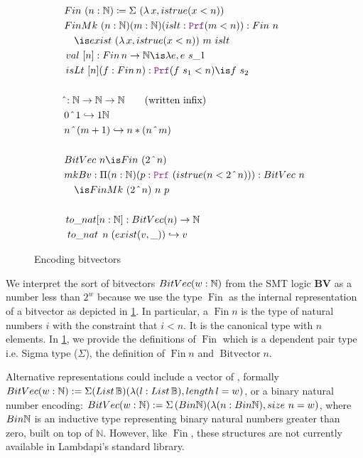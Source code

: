 \begin{figure}
\begin{framed}
\begin{align*}
& Fin~(n: \N) \coloneq \Sigma~(\lambda\,x, istrue(x < n)) \\
& FinMk~(n: \N) (m: \N) (islt: \prf (m < n)) : Fin~n \\
&\quad\is exist~(\lambda\,x, istrue(x <n))~m~islt\\
&\mathop{val}~[n]: \mathop{Fin} n \ra \N \is \lambda e, e~s\_1 \\
&\mathop{isLt}~[n] (f: \mathop{Fin} n): \prf (f~s_1 < n) \is f~s_2\\
&\\
& \hat{}: \N \ra \N \ra \N \qquad \text{(written inﬁx)}\\
& 0 ~\hat{}~ 1 \re 1 \N\\
& n ~\hat{}~ (m + 1) \re n * (n ~\hat{}~ m)\\
&\\
&BitVec~n \is Fin~(2~\hat{}~n) \\ 
& mkBv: \Pi(n: \N)(p: \prf~(istrue(n < 2~\hat{}~n))): BitVec~n\\
&\quad\is FinMk~(2~\hat{}~n)~n~p\\
&\\
&\mathop{to\_nat}[n : \mathbb{N}] : \mathop{BitVec}(n) \ra \mathbb{N} \\
&\,\mathop{to\_nat}\;n\;(\mathop{exist}(v,\_))\re v
\end{align*}
\end{framed}
\caption{Encoding bitvectors}
\label{fig:bitvector-def}
\end{figure}

We interpret the sort of bitvectors $\mathop{BitVec}(w: \mathbb{N})$  from the SMT logic \textbf{BV} as a number less than $2^w$  because we use the type $\mathop{Fin}$ as the internal representation of a bitvector as depicted in \cref{fig:bitvector-def}.
In particular, a $\mathop{Fin} n$ is the type of natural numbers $i$ with the constraint that $i < n$. It is the canonical type with $n$ elements. In \cref{fig:bitvector-def}, we provide the definitions of $\mathop{Fin}$
which is a dependent pair type i.e. Sigma type ($\Sigma$), the definition of $\mathop{Fin} n$ and $\mathop{Bitvector} n$.

Alternative representations could include a vector of \B{},
formally $\mathop{BitVec}(w: \mathbb{N}) := \Sigma(\mathop{List\,\mathbb{B}})(\lambda(l: \mathop{List\,\mathbb{B}}),\mathop{length}l = w)$,
or a binary natural number encoding: $\mathop{BitVec}(w: \mathbb{N}) := \Sigma\,(\mathop{Bin\mathbb{N}})(\lambda (n:\mathop{Bin\mathbb{N}}), \mathop{size}\,n = w)$, where $\mathop{Bin\mathbb{N}}$
is an inductive type representing binary natural numbers greater than zero, built on top of $\mathbb{N}$.
However, like $\mathop{Fin}$, these structures are not currently available in Lambdapi's standard library.

